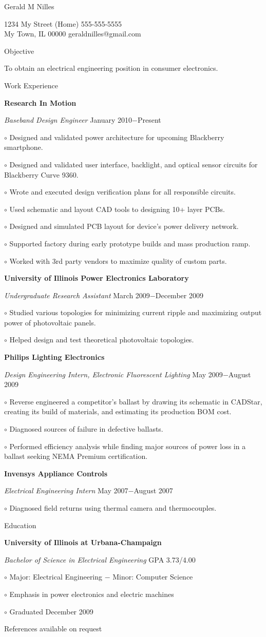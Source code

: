 \documentclass[12pt, letterpaper]{article}
\newcommand{\myname}[1]{{\begin{center} \LARGE #1 \end{center} \par }}
\newcommand{\myhead}[1]{{\vspace{2mm} \Large #1 \par}}
\newcommand{\objective}[1]{{\addtolength{\leftskip}{10mm} #1 \par }}
\newcommand{\company}[1]{{\vspace{1mm} \addtolength{\leftskip}{10mm} \textbf{#1} \par}}
\newcommand{\position}[2]{{\addtolength{\leftskip}{10mm} \emph{#1} \hfill #2 \par \vspace{1mm}}}
\newcommand{\skill}[1]{{  \vspace{0.3mm} \addtolength{\leftskip}{20mm} \setlength\parindent{-4mm} $\circ$ #1 \par}}
\begin{document}
\pagestyle{empty}
\raggedright

\myname{Gerald M Nilles}
1234 My Street  \hfill (Home) 555-555-5555 \\
My Town, IL 00000   \hfill geraldnilles@gmail.com \\
\myhead{Objective}
    \objective{To obtain an electrical engineering position in consumer electronics.}

\myhead{Work Experience}
    \company{Research In Motion}
    \position{Baseband Design Engineer}{January 2010$-$Present}
        \skill{Designed and validated power architecture for upcoming Blackberry smartphone.}
        \skill{Designed and validated user interface, backlight, and optical sensor circuits for Blackberry Curve 9360.}
        \skill{Wrote and executed design verification plans for all responsible circuits.}
        \skill{Used schematic and layout CAD tools to designing 10+ layer PCBs.}
        \skill{Designed and simulated PCB layout for device's power delivery network.}
        \skill{Supported factory during early prototype builds and mass production ramp.}
        \skill{Worked with 3rd party vendors to maximize quality of custom parts.}

    \company{University of Illinois Power Electronics Laboratory}
    \position{Undergraduate Research Assistant}{March 2009$-$December 2009}
        \skill{Studied various topologies for minimizing current ripple and maximizing output power of photovoltaic panels.}
        \skill{Helped design and test theoretical photovoltaic topologies.}

    \company{Philips Lighting Electronics} 
    \position{Design Engineering Intern, Electronic Fluorescent Lighting}{May 2009$-$August 2009}
        \skill{Reverse engineered a competitor's ballast by drawing its schematic in CADStar, creating its build of materials, and estimating its production BOM cost.}
        \skill{Diagnosed sources of failure in defective ballasts.}
        \skill{Performed efficiency analysis while finding major sources of power loss in a ballast seeking NEMA Premium certification.}

    \company{Invensys Appliance Controls}
    \position{Electrical Engineering Intern}{May 2007$-$August 2007}
        \skill{Diagnosed field returns using thermal camera and thermocouples.}

\myhead{Education}
    \company{University of Illinois at Urbana-Champaign}
    \position{Bachelor of Science in Electrical Engineering}{GPA 3.73/4.00}
        \skill{Major: Electrical Engineering $-$ Minor: Computer Science}
        \skill{Emphasis in power electronics and electric machines}
        \skill{Graduated December 2009}

\begin{center}
\small
References available on request
\end{center}
\end{document}

